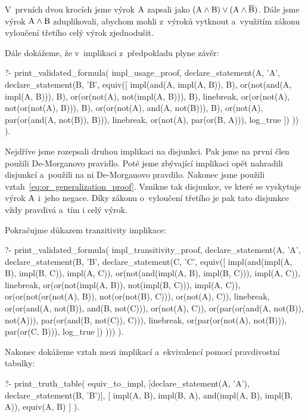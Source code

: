 V~prvních dvou krocích jsme výrok \(\mathrm{A}\) zapsali jako \((\mathrm{A} \land \mathrm{B}) \lor (\mathrm{A} \land \overline{\mathrm{B}})\). Dále jsme výrok \(\mathrm{A} \land \mathrm{B}\) zduplikovali, abychom mohli z~výroků vytknout a~využitím zákonu vyloučení třetího celý výrok zjednodušit.

Dále dokážeme, že v~implikaci z~předpokladu plyne závěr:

\begin{prolog}
?- print_validated_formula(
	impl_usage_proof,
	declare_statement(A, 'A', declare_statement(B, 'B',
		equiv([
			impl(and(A, impl(A, B)), B),
			or(not(and(A, impl(A, B))), B),
			or(or(not(A), not(impl(A, B))), B),
			linebreak,
			or(or(not(A), not(or(not(A), B))), B),
			or(or(not(A), and(A, not(B))), B),
			or(not(A), par(or(and(A, not(B)), B))),
			linebreak,
			or(not(A), par(or(B, A))),
			log_true
		])
	))
).
\end{prolog}

Nejdříve jsme rozepsali druhou implikaci na disjunkci. Pak jsme na první člen použili De-Morganovo pravidlo. Poté jsme zbývající implikaci opět nahradili disjunkcí a~použili na ni De-Morganovo pravdilo. Nakonec jsme použili vztah~\eqref{eq:or_generalization_proof}. Vznikne tak disjunkce, ve které se vyskytuje výrok 
\(\mathrm{A}\) i~jeho negace. Díky zákonu o~vyloučení třetího je pak tato disjunkce vždy pravdivá a~tím i celý výrok.

Pokračujme důkazem tranzitivity implikace:

\begin{prolog}
?- print_validated_formula(
	impl_transitivity_proof,
	declare_statement(A, 'A', declare_statement(B, 'B', declare_statement(C, 'C',
		equiv([
			impl(and(impl(A, B), impl(B, C)), impl(A, C)),
			or(not(and(impl(A, B), impl(B, C))), impl(A, C)),
			linebreak,
			or(or(not(impl(A, B)), not(impl(B, C))), impl(A, C)),
			or(or(not(or(not(A), B)), not(or(not(B), C))), or(not(A), C)),
			linebreak,
			or(or(and(A, not(B)), and(B, not(C))), or(not(A), C)),
			or(par(or(and(A, not(B)), not(A))), par(or(and(B, not(C)), C))),
			linebreak,
			or(par(or(not(A), not(B))), par(or(C, B))),
			log_true
		])
	)))
).
\end{prolog}

Nakonec dokážeme vztah mezi implikací a~ekvivalencí pomocí pravdivostní tabulky:


\begin{prolog}
?- print_truth_table(
	equiv_to_impl,
	[declare_statement(A, 'A'), declare_statement(B, 'B')],
	[
		impl(A, B),
		impl(B, A),
		and(impl(A, B), impl(B, A)),
		equiv(A, B)
	]
).
\end{prolog}

